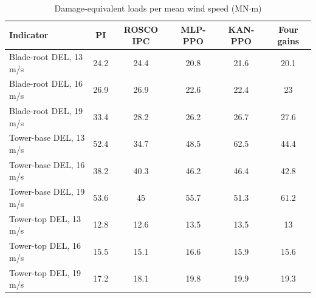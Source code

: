\begin{table}[!t]
\centering
\caption{Damage-equivalent loads per mean wind speed (MN$\cdot$m)}
\label{tab:bywind}
\renewcommand{\arraystretch}{1.15}
\begin{tabular}{lccccc}
\hline\hline
Indicator & PI & ROSCO IPC & MLP-PPO & KAN-PPO & Four gains \\
\hline
Blade-root DEL, 13 m/s & 24.2 & 24.4 & 20.8 & 21.6 & 20.1 \\
Blade-root DEL, 16 m/s & 26.9 & 26.9 & 22.6 & 22.4 & 23 \\
Blade-root DEL, 19 m/s & 33.4 & 28.2 & 26.2 & 26.7 & 27.6 \\
Tower-base DEL, 13 m/s & 52.4 & 34.7 & 48.5 & 62.5 & 44.4 \\
Tower-base DEL, 16 m/s & 38.2 & 40.3 & 46.2 & 46.4 & 42.8 \\
Tower-base DEL, 19 m/s & 53.6 & 45 & 55.7 & 51.3 & 61.2 \\
Tower-top DEL, 13 m/s & 12.8 & 12.6 & 13.5 & 13.5 & 13 \\
Tower-top DEL, 16 m/s & 15.5 & 15.1 & 16.6 & 15.9 & 15.6 \\
Tower-top DEL, 19 m/s & 17.2 & 18.1 & 19.8 & 19.9 & 19.3 \\
\hline\hline
\end{tabular}
\end{table}
